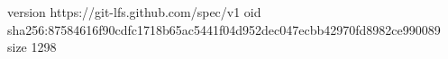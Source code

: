 version https://git-lfs.github.com/spec/v1
oid sha256:87584616f90cdfc1718b65ac5441f04d952dec047ecbb42970fd8982ce990089
size 1298
